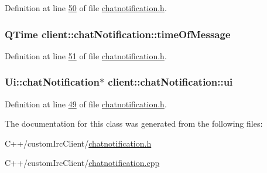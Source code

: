 Definition at line \hyperlink{chatnotification_8h_source_l00050}{50} of file \hyperlink{chatnotification_8h_source}{chatnotification.\-h}.

\hypertarget{classclient_1_1chat_notification_ac2cf7f6030625593ba26f5f62ebd3482}{
\subsubsection[{time\-Of\-Message}]{\setlength{\rightskip}{0pt plus 5cm}Q\-Time client\-::chat\-Notification\-::time\-Of\-Message\hspace{0.3cm}{\ttfamily [private]}}}\label{d5/d17/classclient_1_1chat_notification_ac2cf7f6030625593ba26f5f62ebd3482}


Definition at line \hyperlink{chatnotification_8h_source_l00051}{51} of file \hyperlink{chatnotification_8h_source}{chatnotification.\-h}.

\hypertarget{classclient_1_1chat_notification_af80ab0e57d9b0a0bb79abf5a991fdfab}{
\subsubsection[{ui}]{\setlength{\rightskip}{0pt plus 5cm}Ui\-::chat\-Notification$\ast$ client\-::chat\-Notification\-::ui\hspace{0.3cm}{\ttfamily [private]}}}\label{d5/d17/classclient_1_1chat_notification_af80ab0e57d9b0a0bb79abf5a991fdfab}


Definition at line \hyperlink{chatnotification_8h_source_l00049}{49} of file \hyperlink{chatnotification_8h_source}{chatnotification.\-h}.



The documentation for this class was generated from the following files\-:\begin{DoxyCompactItemize}
\item 
C++/custom\-Irc\-Client/\hyperlink{chatnotification_8h}{chatnotification.\-h}\item 
C++/custom\-Irc\-Client/\hyperlink{chatnotification_8cpp}{chatnotification.\-cpp}\end{DoxyCompactItemize}

